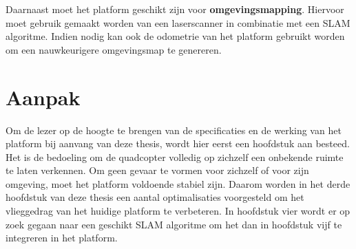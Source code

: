 \npar Daarnaast moet het platform geschikt zijn voor \textbf{omgevingsmapping}. Hiervoor moet gebruik gemaakt worden van een laserscanner in combinatie met een SLAM algoritme. Indien nodig kan ook de odometrie van het platform gebruikt worden om een nauwkeurigere omgevingsmap te genereren.

\section{Aanpak}
Om de lezer op de hoogte te brengen van de specificaties en de werking van het platform bij aanvang van deze thesis, wordt hier eerst een hoofdstuk aan besteed. Het is de bedoeling om de quadcopter volledig op zichzelf een onbekende ruimte te laten verkennen. Om geen gevaar te vormen voor zichzelf of voor zijn omgeving, moet het platform voldoende stabiel zijn. Daarom worden in het derde hoofdstuk van deze thesis een aantal optimalisaties voorgesteld om het vlieggedrag van het huidige platform te verbeteren. In hoofdstuk vier wordt er op zoek gegaan naar een geschikt SLAM algoritme om het dan in hoofdstuk vijf te integreren in het platform.
